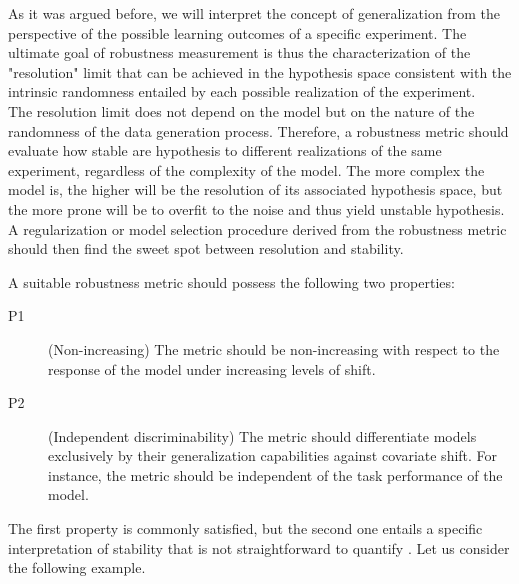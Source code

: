 As it was argued before, we will 
interpret the concept of generalization from the 
perspective of the possible learning outcomes
of a specific experiment. The ultimate goal 
of robustness measurement is thus the characterization of the "resolution" 
limit that can be achieved in the hypothesis space 
consistent with the intrinsic randomness entailed by each 
possible realization of the experiment. \\

The resolution limit does not depend on the model but on the 
nature of the randomness of the data generation process. 
Therefore, a robustness metric should evaluate how stable are hypothesis 
to different realizations of the same experiment, regardless 
of the complexity of the model. The more 
complex the model is, the higher will be the resolution of its
associated hypothesis space, but the more prone will be to overfit
to the noise and thus yield unstable hypothesis. A regularization 
or model selection procedure derived from the robustness metric 
should then find the sweet spot between resolution and stability. \\

\begin{properties}\label{properties:robustness}
    A suitable robustness metric should possess the following two properties:
\begin{description}
    \item[P1](Non-increasing) The metric should be non-increasing with respect to the
    response of the model under increasing levels of shift.
    \item[P2](Independent discriminability) The metric should differentiate models exclusively by their generalization capabilities against 
    covariate shift. For instance, the metric should be independent of the task
    performance of the model.
\end{description}
\end{properties}

The first property is commonly satisfied, but the second one entails
a specific interpretation of stability that is not straightforward to
quantify \cite{buhmannPosteriorAgreementModel2022}. Let us consider
the following example.

